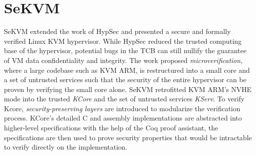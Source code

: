 \section{SeKVM}
\label{sec:sekvmintro}

SeKVM \cite{sekvm} extended the work of HypSec and presented a secure and formally verified
Linux KVM hypervisor. While HypSec reduced the trusted computing base of the
hypervisor, potential bugs in the TCB can still nullify the guarantee of VM
data confidentiality and integrity. The work proposed \textit{microverification},
where a large codebase such as KVM ARM, is restructured into a small core and a
set of untrusted services such that the security of the entire hypervisor can
be proven by verifying the small core alone. SeKVM retrofitted KVM ARM's NVHE
mode into the trusted \textit{KCore} and the set of untrusted services
\textit{KServ}.
To verify Kcore, \textit{security-preserving layers} are introduced to
modularize the verification process.
KCore's detailed C and assembly implementations are abstracted into higher-level
specifications with the help of the Coq proof assistant, the specifications are
then used to prove security properties that would be intractable to verify
directly on the implementation.






